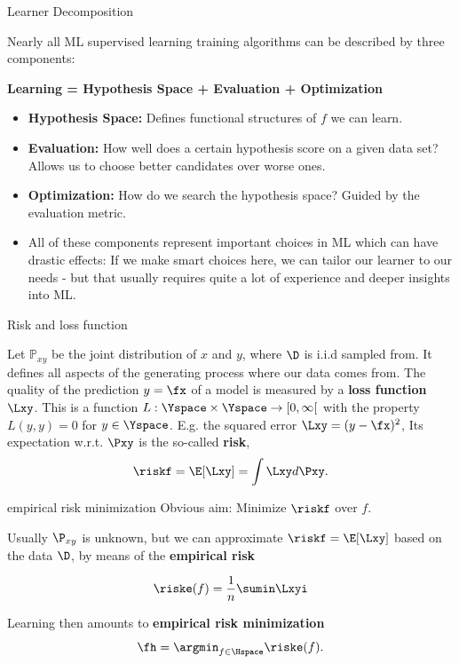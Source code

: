 \begin{frame}{Learner Decomposition}

Nearly all ML supervised learning training algorithms can be described
by three components:

\begin{center}
  \textbf{Learning = Hypothesis Space + Evaluation + Optimization}
\end{center}

\begin{itemize}
\item
  \textbf{Hypothesis Space:} Defines functional
  structures of \(f\) we can learn.
\item
  \textbf{Evaluation:} How well does a certain hypothesis score on a
  given data set? Allows us to choose better candidates over worse ones.
\item
  \textbf{Optimization:} How do we search the hypothesis space? Guided
  by the evaluation metric.
\item
  All of these components represent important choices in ML which can
  have drastic effects:
  \newline
  If we make smart choices here, we can tailor our learner to our needs
  - but that usually requires quite a lot of experience and deeper
  insights into ML.
\end{itemize}

\end{frame}


\begin{vbframe}{Risk and loss function}

Let \(\mathbb P_{xy}\) be the joint distribution of \(x\) and \(y\), where $\D$ is i.i.d sampled from. It defines all aspects of the generating process where our data comes from. 
\vfill
The quality of the prediction $y=\fx$ of a model is measured by a \textbf{loss function} $\Lxy $.
\vfill
This is a  function $L :\Yspace \times \Yspace \rightarrow [0, \infty[$ with the property $L(y, y) = 0$ for $y \in  \Yspace$.
\vfill
E.g. the squared error $\Lxy = (y-\fx)^2$,
\vfill
Its expectation w.r.t. $\Pxy$ is the so-called \textbf{risk},
  $$ \riskf = \E [\Lxy] = \int \Lxy d\Pxy. $$
\end{vbframe}


\begin{frame}{empirical risk minimization}
Obvious aim: Minimize $\riskf$ over $f$.
 
Usually  $\P_{xy}$ is unknown, but we can approximate $\riskf= \E [\Lxy]$ based on
the data $\D$, by means of the \textbf{empirical risk}

$$
\riske(f) = \frac{1}{n} \sumin \Lxyi
$$

Learning then amounts to \textbf{empirical risk minimization}
$$
\fh = \argmin_{f \in \Hspace} \riske(f).
$$

\end{frame}

